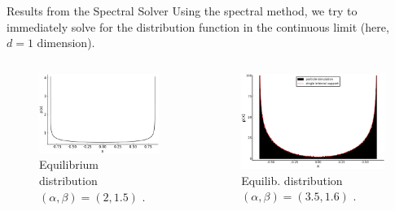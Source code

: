 \documentclass[aspectratio=169, hyperref={colorlinks=true}]{beamer}
\begin{document}
  \begin{frame}{Results from the Spectral Solver}
    \vspace{0.4cm}
    Using the spectral method, we try to immediately solve for the distribution function in the continuous limit (here, $d = 1$ dimension).
    \vspace{0.4cm}

    \begin{columns}
      \begin{column}{0.5\textwidth}
        \begin{figure}[H]
          \centering
          \includegraphics[width=0.9\linewidth]{figures/a2b1-5-measure.pdf}
          \caption*{Equilibrium distribution $(\alpha,\beta) = (2, 1.5)$ \cite{2020-power-law-kernels}.}
        \end{figure}
      \end{column}
      \begin{column}{0.5\textwidth}
        \begin{figure}[H]
          \centering
          \includegraphics[width=0.9\linewidth]{figures/a35b16_supplement_3k.pdf}
          \caption*{Equilib. distribution $(\alpha, \beta) = (3.5, 1.6)$ \cite{2020-power-law-kernels}.}
        \end{figure}
      \end{column}
    \end{columns}
  \end{frame}
\end{document}
